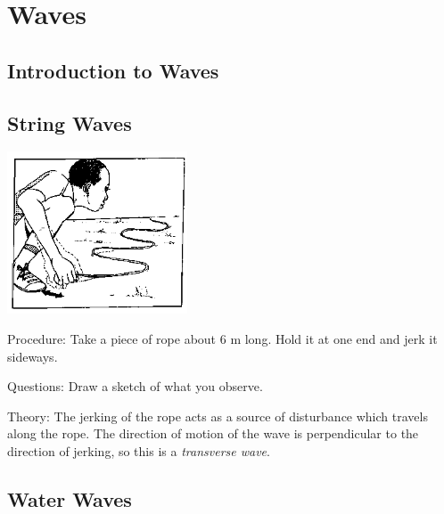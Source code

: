 \section{Waves}

\begin{multicols}{2}


\section*{Introduction to Waves}


\subsection{String Waves}

\begin{center}
\includegraphics[width=0.4\textwidth]{./img/source/string-waves.png}
\end{center}

\begin{description*}
\item[Procedure:]{Take a piece of rope about 6 m long. Hold it at one end and jerk it sideways.}
\item[Questions:]{Draw a sketch of what you observe.}
\item[Theory:]{The jerking of the rope acts as a source of disturbance which travels along the rope. The direction of motion of the wave is perpendicular to the direction of jerking, so this is a \emph{transverse wave}.}
\end{description*}

\subsection{Water Waves}


\end{multicols}
